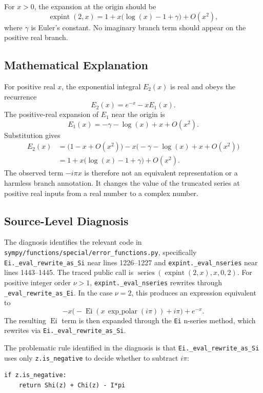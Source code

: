 \documentclass[11pt]{article}
\begin{document}
For \(x>0\), the expansion at the origin should be
\[
  \operatorname{expint}(2,x)
  = 1 + x\bigl(\log(x)-1+\gamma\bigr) + O(x^2),
\]
where \(\gamma\) is Euler's constant.  No imaginary branch term should appear on
the positive real branch.

\subsection{Mathematical Explanation}

For positive real \(x\), the exponential integral \(E_2(x)\) is real and obeys
the recurrence
\[
  E_2(x) = e^{-x} - x E_1(x).
\]
The positive-real expansion of \(E_1\) near the origin is
\[
  E_1(x) = -\gamma - \log(x) + x + O(x^2).
\]
Substitution gives
\[
\begin{aligned}
  E_2(x)
    &= \bigl(1-x+O(x^2)\bigr)
       - x\bigl(-\gamma-\log(x)+x+O(x^2)\bigr) \\
    &= 1 + x\bigl(\log(x)-1+\gamma\bigr) + O(x^2).
\end{aligned}
\]
The observed term \(-i\pi x\) is therefore not an equivalent representation or a
harmless branch annotation.  It changes the value of the truncated series at
positive real inputs from a real number to a complex number.

\subsection{Source-Level Diagnosis}

The diagnosis identifies the relevant code in
\nolinkurl{sympy/functions/special/error_functions.py}, specifically
\texttt{Ei.\_eval\_rewrite\_as\_Si} near lines 1226--1227 and
\texttt{expint.\_eval\_nseries} near lines 1443--1445.  The traced public call is
\(\operatorname{series}(\operatorname{expint}(2,x),x,0,2)\).  For positive
integer order \(\nu>1\), \texttt{expint.\_eval\_nseries} rewrites through
\texttt{\_eval\_rewrite\_as\_Ei}.  In the case \(\nu=2\), this produces an
expression equivalent to
\[
  -x\bigl(-\operatorname{Ei}(x\,\operatorname{exp\_polar}(i\pi))+i\pi\bigr)
  + e^{-x}.
\]
The resulting \(\operatorname{Ei}\) term is then expanded through the
\texttt{Ei} n-series method, which rewrites via
\nolinkurl{Ei._eval_rewrite_as_Si}.

The problematic rule identified in the diagnosis is that
\texttt{Ei.\_eval\_rewrite\_as\_Si} uses only \texttt{z.is\_negative} to decide
whether to subtract \(i\pi\):

\begin{lstlisting}[style=bugpython]
if z.is_negative:
    return Shi(z) + Chi(z) - I*pi
\end{lstlisting}
\end{document}
